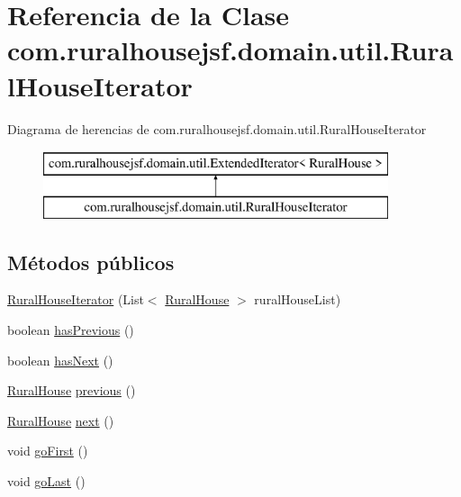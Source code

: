 \hypertarget{classcom_1_1ruralhousejsf_1_1domain_1_1util_1_1_rural_house_iterator}{}\section{Referencia de la Clase com.\+ruralhousejsf.\+domain.\+util.\+Rural\+House\+Iterator}
\label{classcom_1_1ruralhousejsf_1_1domain_1_1util_1_1_rural_house_iterator}
Diagrama de herencias de com.\+ruralhousejsf.\+domain.\+util.\+Rural\+House\+Iterator\begin{figure}[H]
\begin{center}
\leavevmode
\includegraphics[height=2.000000cm]{classcom_1_1ruralhousejsf_1_1domain_1_1util_1_1_rural_house_iterator}
\end{center}
\end{figure}
\subsection*{Métodos públicos}
\begin{DoxyCompactItemize}
\item 
\mbox{\hyperlink{classcom_1_1ruralhousejsf_1_1domain_1_1util_1_1_rural_house_iterator_aa0a65be50d1149a49a37203d411279d3}{Rural\+House\+Iterator}} (List$<$ \mbox{\hyperlink{classcom_1_1ruralhousejsf_1_1domain_1_1_rural_house}{Rural\+House}} $>$ rural\+House\+List)
\item 
boolean \mbox{\hyperlink{classcom_1_1ruralhousejsf_1_1domain_1_1util_1_1_rural_house_iterator_a90b778a08dfc34d566860a169a3001b9}{has\+Previous}} ()
\item 
boolean \mbox{\hyperlink{classcom_1_1ruralhousejsf_1_1domain_1_1util_1_1_rural_house_iterator_a9c16d216cbe652522d6c903294938eda}{has\+Next}} ()
\item 
\mbox{\hyperlink{classcom_1_1ruralhousejsf_1_1domain_1_1_rural_house}{Rural\+House}} \mbox{\hyperlink{classcom_1_1ruralhousejsf_1_1domain_1_1util_1_1_rural_house_iterator_af8df4b4ec1f3a626dbda91cf23daeb08}{previous}} ()
\item 
\mbox{\hyperlink{classcom_1_1ruralhousejsf_1_1domain_1_1_rural_house}{Rural\+House}} \mbox{\hyperlink{classcom_1_1ruralhousejsf_1_1domain_1_1util_1_1_rural_house_iterator_ad3bcb60befad58cc8bd1377459ae729b}{next}} ()
\item 
void \mbox{\hyperlink{classcom_1_1ruralhousejsf_1_1domain_1_1util_1_1_rural_house_iterator_a843246b6edfb1409f7fe9afc1215bc31}{go\+First}} ()
\item 
void \mbox{\hyperlink{classcom_1_1ruralhousejsf_1_1domain_1_1util_1_1_rural_house_iterator_a58fe2a76236f3578ff3eb7f22b14bc5c}{go\+Last}} ()
\end{DoxyCompactItemize}



